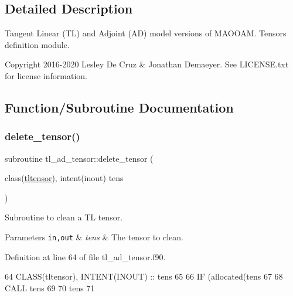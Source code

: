 \subsection{Detailed Description}
Tangent Linear (TL) and Adjoint (AD) model versions of M\+A\+O\+O\+AM. Tensors definition module. 

\begin{DoxyCopyright}{Copyright}
2016-\/2020 Lesley De Cruz \& Jonathan Demaeyer. See L\+I\+C\+E\+N\+S\+E.\+txt for license information. 
\end{DoxyCopyright}


\subsection{Function/\+Subroutine Documentation}
\mbox{\label{namespacetl__ad__tensor_a32d0c5d5ffa50695665256d151494242}} 
\subsubsection{\texorpdfstring{delete\+\_\+tensor()}{delete\_tensor()}}
{\footnotesize\ttfamily subroutine tl\+\_\+ad\+\_\+tensor\+::delete\+\_\+tensor (\begin{DoxyParamCaption}\item[{class(\hyperlink{structtl__ad__tensor_1_1tltensor}{tltensor}), intent(inout)}]{tens }\end{DoxyParamCaption})}



Subroutine to clean a TL tensor. 


\begin{DoxyParams}[1]{Parameters}
\mbox{\tt in,out}  & {\em tens} & The tensor to clean. \\
\hline
\end{DoxyParams}


Definition at line 64 of file tl\+\_\+ad\+\_\+tensor.\+f90.


\begin{DoxyCode}
64     \textcolor{keywordtype}{CLASS}(tltensor), \textcolor{keywordtype}{INTENT(INOUT)} :: tens
65 
66     \textcolor{keywordflow}{IF} (\textcolor{keyword}{allocated}(tens%
67 
68     \textcolor{keyword}{CALL }tens%
69 
70     tens%
71 
\end{DoxyCode}
\mbox{\label{namespacetl__ad__tensor_a3d080c8d8025fb99310e10b5f30398c5}} 
